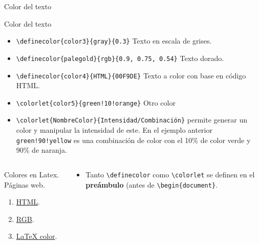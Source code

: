 \documentclass[aspectratio=169, 10pt]{beamer}
\begin{document}
\begin{frame}[fragile]{Color del texto}

\begin{block}{Color del texto}
            \begin{itemize} 
                \item \verb|\definecolor{color3}{gray}{0.3}|  \textcolor{color3}{Texto en escala de grises.} \pause
                \item \verb|\definecolor{palegold}{rgb}{0.9, 0.75, 0.54}|  \textcolor{palegold}{Texto dorado.} \pause
                \item \verb|\definecolor{color4}{HTML}{00F9DE}|  \textcolor{color4}{Texto a color con base en código HTML.} \pause
                \item \verb|\colorlet{color5}{green!10!orange}|  \textcolor{color5}{Otro color} \pause
                \item \verb|\colorlet{NombreColor}{Intensidad/Combinación}| permite generar un color y manipular la intensidad de este. En el ejemplo anterior \verb|green!90!yellow| es una combinación de color con el 10\% de color verde y 90\% de naranja.
            \end{itemize}
            \end{block} 

\vspace{-2.5mm}
\begin{columns}
    \begin{column}{.40\linewidth}
    \begin{exampleblock}{Colores en Latex. Páginas web.}
    
        \begin{enumerate}
    \item \href{https://htmlcolorcodes.com/es/}{HTML}. 
    \item \href{https://www.rapidtables.com/web/color/RGB_Color.html}{RGB}. 
    \item \href{https://latexcolor.com/}{LaTeX color}. 

    \end{enumerate}
\end{exampleblock}
    \end{column}

    \begin{column}{.50\linewidth}
        \begin{alertblock}{}
            \begin{itemize}
                \item Tanto \verb|\definecolor| como \verb|\colorlet| se definen en el \textbf{preámbulo} (antes de \verb|\begin{document}|.
            \end{itemize}
        \end{alertblock}
    \end{column}
\end{columns}

\end{frame}
\end{document}
